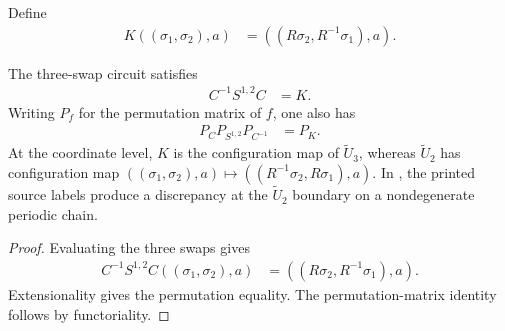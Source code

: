 \begin{definition}
    \label{def:mpu_shift_ancilla_counter_shift}
    \leanok
    Define
    \begin{align}
        K((\sigma_1,\sigma_2),a)
         & =((R\sigma_2,R^{-1}\sigma_1),a).
    \end{align}
\end{definition}

\begin{lemma}
    \label{thm:mpu_shift_ancilla_three_swap_endpoint}
    \leanok
    The three-swap circuit satisfies
    \begin{align}
        C^{-1}S^{1,2}C & =K.
    \end{align}
    Writing $P_f$ for the permutation matrix of $f$, one also has
    \begin{align}
        P_C P_{S^{1,2}} P_{C^{-1}} & =P_K.
    \end{align}
    At the coordinate level, $K$ is the configuration map of
    $\widetilde U_3$, whereas $\widetilde U_2$ has configuration map
    $((\sigma_1,\sigma_2),a)\mapsto
        ((R^{-1}\sigma_2,R\sigma_1),a)$.
    In \cite[Figure~16]{Cirac2017MPU}, the printed source labels produce a discrepancy at the $\widetilde U_2$
    boundary on a nondegenerate periodic
    chain.
\end{lemma}

\begin{proof}\leanok
    Evaluating the three swaps gives
    \begin{align}
        C^{-1}S^{1,2}C((\sigma_1,\sigma_2),a)
         & =((R\sigma_2,R^{-1}\sigma_1),a).
    \end{align}
    Extensionality gives the permutation equality. The permutation-matrix
    identity follows by functoriality.
\end{proof}

